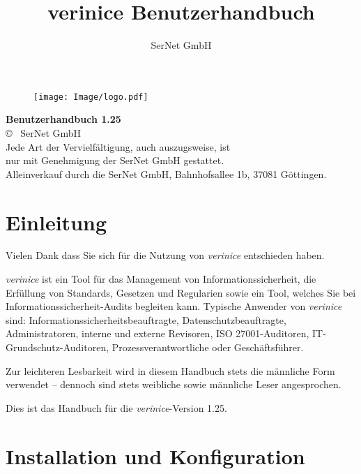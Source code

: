 \documentclass[a4paper,10pt]{book}
\title{verinice Benutzerhandbuch \vnversion{}}
\author{SerNet GmbH}
\newcommand*{\vnversion}{1.25}
\begin{document}

\begin{titlepage}
  \centering
  \vspace{1cm}
  \begin{figure}[htb!]
    \centering
    \colorbox{white}{\texttt{[image: Image/logo.pdf]}}
  \end{figure}
  \huge\textbf{Benutzerhandbuch \vnversion{}}\\
  \small
  \vspace{13.5cm}
  \copyright{} \the\year\ SerNet GmbH\\
  Jede Art der Vervielfältigung, auch auszugsweise, ist\\
  nur mit Genehmigung der SerNet GmbH gestattet.\\
  Alleinverkauf durch die SerNet GmbH, Bahnhofsallee 1b, 37081 Göttingen.
  \normalsize
\end{titlepage}

\tableofcontents

\listoftables

\listoffigures


\chapter{Einleitung}


Vielen Dank dass Sie sich für die Nutzung von \textit{verinice} entschieden
haben.

\textit{verinice} ist ein Tool für das Management von Informationssicherheit,
die Erfüllung von Standards, Gesetzen und Regularien sowie ein Tool, welches Sie
bei Informationssicherheit-Audits begleiten kann. Typische Anwender von
\textit{verinice} sind: Informationssicherheitsbeauftragte,
Datenschutzbeauftragte, Administratoren, interne und externe Revisoren, ISO
27001-Auditoren, IT-Grundschutz-Auditoren, Prozessverantwortliche oder
Geschäftsführer.

Zur leichteren Lesbarkeit wird in diesem Handbuch stets die männliche Form
verwendet – dennoch sind stets weibliche sowie männliche Leser angesprochen.

Dies ist das Handbuch für die \textit{verinice}-Version \vnversion{}.

\newpage


\chapter{Installation und Konfiguration}
\end{document}
